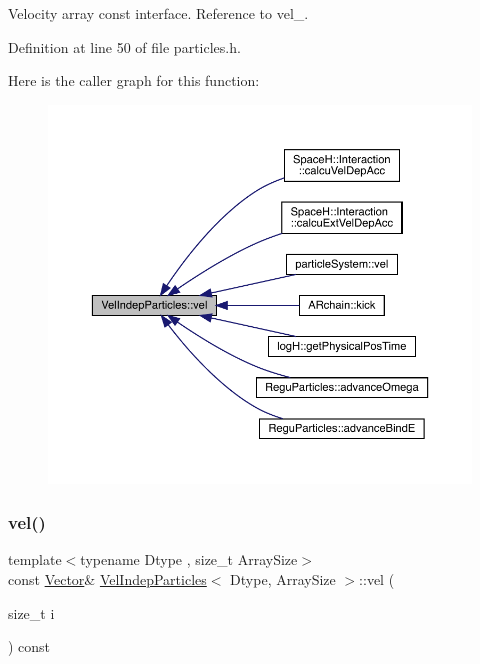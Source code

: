 Velocity array const interface. Reference to vel\+\_\+. 



Definition at line 50 of file particles.\+h.

Here is the caller graph for this function\+:\nopagebreak
\begin{figure}[H]
\begin{center}
\leavevmode
\includegraphics[width=350pt]{class_vel_indep_particles_a5774853214c5f32f34def508962a1267_icgraph}
\end{center}
\end{figure}
\mbox{\label{class_vel_indep_particles_ae5dd02185d239bb0fa5eeeae5a2aec6f}} 
\subsubsection{\texorpdfstring{vel()}{vel()}\hspace{0.1cm}{\footnotesize\ttfamily [2/2]}}
{\footnotesize\ttfamily template$<$typename Dtype , size\+\_\+t Array\+Size$>$ \\
const \mbox{\hyperlink{class_vel_indep_particles_aa7e03da81f44941c06abf43ec2180079}{Vector}}\& \mbox{\hyperlink{class_vel_indep_particles}{Vel\+Indep\+Particles}}$<$ Dtype, Array\+Size $>$\+::vel (\begin{DoxyParamCaption}\item[{size\+\_\+t}]{i }\end{DoxyParamCaption}) const\hspace{0.3cm}{\ttfamily [inline]}}



